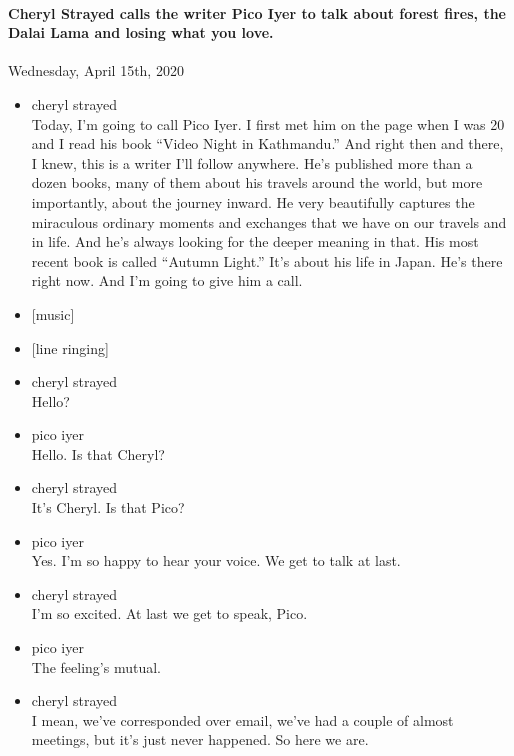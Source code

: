 \hypertarget{cheryl-strayed-calls-the-writer-pico-iyer-to-talk-about-forest-fires-the-dalai-lama-and-losing-what-you-love-2}{%
\paragraph{Cheryl Strayed calls the writer Pico Iyer to talk about
forest fires, the Dalai Lama and losing what you
love.}\label{cheryl-strayed-calls-the-writer-pico-iyer-to-talk-about-forest-fires-the-dalai-lama-and-losing-what-you-love-2}}

Wednesday, April 15th, 2020

\begin{itemize}
\item
  cheryl strayed\\
  Today, I'm going to call Pico Iyer. I first met him on the page when I
  was 20 and I read his book ``Video Night in Kathmandu.'' And right
  then and there, I knew, this is a writer I'll follow anywhere. He's
  published more than a dozen books, many of them about his travels
  around the world, but more importantly, about the journey inward. He
  very beautifully captures the miraculous ordinary moments and
  exchanges that we have on our travels and in life. And he's always
  looking for the deeper meaning in that. His most recent book is called
  ``Autumn Light.'' It's about his life in Japan. He's there right now.
  And I'm going to give him a call.
\item
  {[}music{]}
\item
  {[}line ringing{]}
\item
  cheryl strayed\\
  Hello?
\item
  pico iyer\\
  Hello. Is that Cheryl?
\item
  cheryl strayed\\
  It's Cheryl. Is that Pico?
\item
  pico iyer\\
  Yes. I'm so happy to hear your voice. We get to talk at last.
\item
  cheryl strayed\\
  I'm so excited. At last we get to speak, Pico.
\item
  pico iyer\\
  The feeling's mutual.
\item
  cheryl strayed\\
  I mean, we've corresponded over email, we've had a couple of almost
  meetings, but it's just never happened. So here we are.

\end{itemize}
